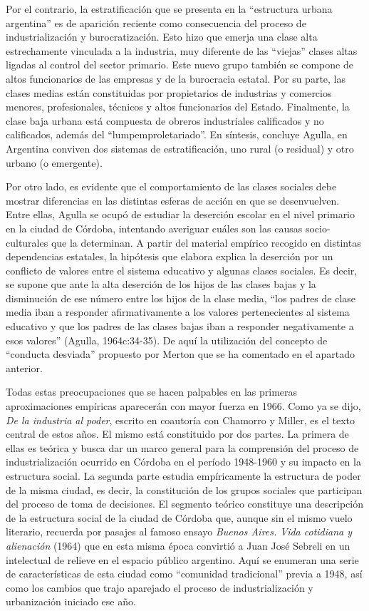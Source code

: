 Por el contrario, la estratificación que se presenta en la ``estructura urbana argentina'' es de aparición reciente como consecuencia del proceso de industrialización y burocratización. Esto hizo que emerja una clase alta estrechamente vinculada a la industria, muy diferente de las ``viejas'' clases altas ligadas al control del sector primario. Este nuevo grupo también se compone de altos funcionarios de las empresas y de la burocracia estatal. Por su parte, las clases medias están constituidas por propietarios de industrias y comercios menores, profesionales, técnicos y altos funcionarios del Estado. Finalmente, la clase baja urbana está compuesta de obreros industriales calificados y no calificados, además del ``lumpemproletariado''. En síntesis, concluye Agulla, en Argentina conviven dos sistemas de estratificación, uno rural (o residual) y otro urbano (o emergente).

Por otro lado, es evidente que el comportamiento de las clases sociales debe mostrar diferencias en las distintas esferas de acción en que se desenvuelven. Entre ellas, Agulla se ocupó de estudiar la deserción escolar en el nivel primario en la ciudad de Córdoba, intentando averiguar cuáles son las causas socio-culturales que la determinan. A partir del material empírico recogido en distintas dependencias estatales, la hipótesis que elabora explica la deserción por un conflicto de valores entre el sistema educativo y algunas clases sociales. Es decir, se supone que ante la alta deserción de los hijos de las clases bajas y la disminución de ese número entre los hijos de la clase media, ``los padres de clase media iban a responder afirmativamente a los valores pertenecientes al sistema educativo y que los padres de las clases bajas iban a responder negativamente a esos valores'' (Agulla, 1964c:34-35). De aquí la utilización del concepto de ``conducta desviada'' propuesto por Merton que se ha comentado en el apartado anterior.

Todas estas preocupaciones que se hacen palpables en las primeras aproximaciones empíricas aparecerán con mayor fuerza en 1966. Como ya se dijo, \emph{De la industria al poder}, escrito en coautoría con Chamorro y Miller, es el texto central de estos años. El mismo está constituido por dos partes. La primera de ellas es teórica y busca dar un marco general para la comprensión del proceso de industrialización ocurrido en Córdoba en el período 1948-1960 y su impacto en la estructura social. La segunda parte estudia empíricamente la estructura de poder de la misma ciudad, es decir, la constitución de los grupos sociales que participan del proceso de toma de decisiones. El segmento teórico constituye una descripción de la estructura social de la ciudad de Córdoba que, aunque sin el mismo vuelo literario, recuerda por pasajes al famoso ensayo \emph{Buenos Aires. Vida cotidiana y alienación} (1964) que en esta misma época convirtió a Juan José Sebreli en un intelectual de relieve en el espacio público argentino. Aquí se enumeran una serie de características de esta ciudad como ``comunidad tradicional'' previa a 1948, así como los cambios que trajo aparejado el proceso de industrialización y urbanización iniciado ese año.

